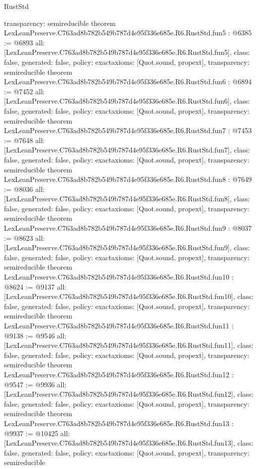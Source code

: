\begin{lexlean}{RustStd}
\begin{coremodule}
{  transparency: semireducible
}
theorem LexLeanPreserve.C763ad8b782b549b787d4e95f336e685e.R6.RustStd.fun5 : @6385 := @6893 {
  all: [LexLeanPreserve.C763ad8b782b549b787d4e95f336e685e.R6.RustStd.fun5],
  class: false,
  generated: false,
  policy: exact{axioms: [Quot.sound, propext]},
  transparency: semireducible
}
theorem LexLeanPreserve.C763ad8b782b549b787d4e95f336e685e.R6.RustStd.fun6 : @6894 := @7452 {
  all: [LexLeanPreserve.C763ad8b782b549b787d4e95f336e685e.R6.RustStd.fun6],
  class: false,
  generated: false,
  policy: exact{axioms: [Quot.sound, propext]},
  transparency: semireducible
}
theorem LexLeanPreserve.C763ad8b782b549b787d4e95f336e685e.R6.RustStd.fun7 : @7453 := @7648 {
  all: [LexLeanPreserve.C763ad8b782b549b787d4e95f336e685e.R6.RustStd.fun7],
  class: false,
  generated: false,
  policy: exact{axioms: [Quot.sound, propext]},
  transparency: semireducible
}
theorem LexLeanPreserve.C763ad8b782b549b787d4e95f336e685e.R6.RustStd.fun8 : @7649 := @8036 {
  all: [LexLeanPreserve.C763ad8b782b549b787d4e95f336e685e.R6.RustStd.fun8],
  class: false,
  generated: false,
  policy: exact{axioms: [Quot.sound, propext]},
  transparency: semireducible
}
theorem LexLeanPreserve.C763ad8b782b549b787d4e95f336e685e.R6.RustStd.fun9 : @8037 := @8623 {
  all: [LexLeanPreserve.C763ad8b782b549b787d4e95f336e685e.R6.RustStd.fun9],
  class: false,
  generated: false,
  policy: exact{axioms: [Quot.sound, propext]},
  transparency: semireducible
}
theorem LexLeanPreserve.C763ad8b782b549b787d4e95f336e685e.R6.RustStd.fun10 : @8624 := @9137 {
  all: [LexLeanPreserve.C763ad8b782b549b787d4e95f336e685e.R6.RustStd.fun10],
  class: false,
  generated: false,
  policy: exact{axioms: [Quot.sound, propext]},
  transparency: semireducible
}
theorem LexLeanPreserve.C763ad8b782b549b787d4e95f336e685e.R6.RustStd.fun11 : @9138 := @9546 {
  all: [LexLeanPreserve.C763ad8b782b549b787d4e95f336e685e.R6.RustStd.fun11],
  class: false,
  generated: false,
  policy: exact{axioms: [Quot.sound, propext]},
  transparency: semireducible
}
theorem LexLeanPreserve.C763ad8b782b549b787d4e95f336e685e.R6.RustStd.fun12 : @9547 := @9936 {
  all: [LexLeanPreserve.C763ad8b782b549b787d4e95f336e685e.R6.RustStd.fun12],
  class: false,
  generated: false,
  policy: exact{axioms: [Quot.sound, propext]},
  transparency: semireducible
}
theorem LexLeanPreserve.C763ad8b782b549b787d4e95f336e685e.R6.RustStd.fun13 : @9937 := @10425 {
  all: [LexLeanPreserve.C763ad8b782b549b787d4e95f336e685e.R6.RustStd.fun13],
  class: false,
  generated: false,
  policy: exact{axioms: [Quot.sound, propext]},
  transparency: semireducible
}
\end{coremodule}
\end{lexlean}
